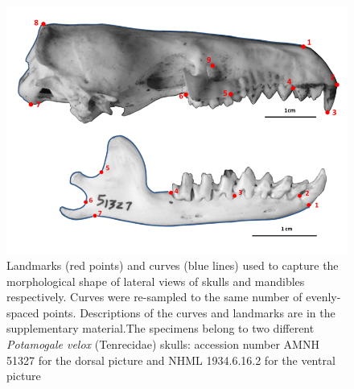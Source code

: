 \documentclass[12pt,a4paper]{article}
\begin{document}
	\begin{figure}[H]
	\centering
	\includegraphics[width=1\linewidth]{figures/SkLat+mands_landmark_diagrams.png}
	
	\caption[Diagrams of the landmarks and curves used for lateral views of skulls and mandibles]
		{Landmarks (red points) and curves (blue lines) used to capture the morphological shape of lateral views of skulls and mandibles respectively. Curves were re-sampled to the same number of evenly-spaced points. Descriptions of the curves and landmarks are in the supplementary material.The specimens belong to two different \textit{Potamogale velox} (Tenrecidae) skulls: accession number AMNH 51327 for the dorsal picture and NHML 1934.6.16.2 for the ventral picture}
	
	\label{fig:sklat_mands_landmarks}
	\end{figure}
%



\end{document}
